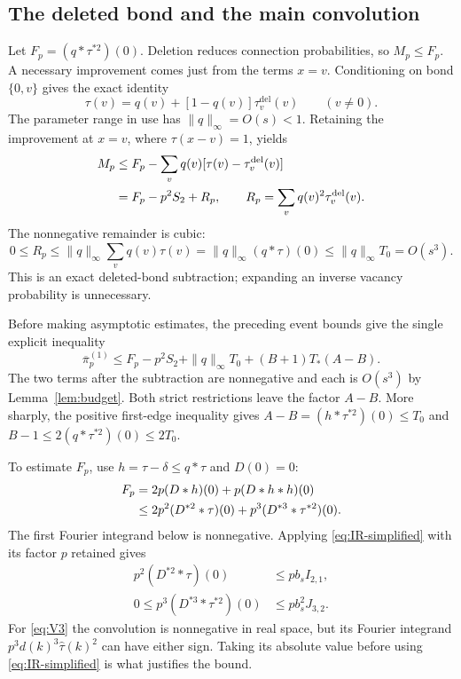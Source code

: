 \documentclass[11pt]{article}
\theoremstyle{definition}
\newcommand{\del}{\mathrm{del}}
\begin{document}
\subsection{The deleted bond and the main convolution}

Let $F_p=(q*\tau^{*2})(0)$. Deletion reduces connection probabilities,
so $M_p\le F_p$. A necessary improvement comes just from the terms
$x=v$. Conditioning on bond $\{0,v\}$ gives the exact identity
\begin{equation}\label{eq:bond-conditioning}
 \tau(v)=q(v)+[1-q(v)]\tau_v^{\del}(v)\qquad(v\ne0).
\end{equation}
The parameter range in use has $\|q\|_\infty=O(s)<1$. Retaining the
improvement at $x=v$, where $\tau(x-v)=1$, yields
\begin{align}
 M_p&\le F_p-\sum_vq(v)[\tau(v)-\tau_v^{\del}(v)]\notag\\
 &=F_p-p^2S_2+R_p,\qquad
 R_p=\sum_vq(v)^2\tau_v^{\del}(v).\label{eq:deleted-subtraction}
\end{align}
The nonnegative remainder is cubic:
\begin{equation}\label{eq:deleted-error}
 0\le R_p\le\|q\|_\infty\sum_vq(v)\tau(v)
 =\|q\|_\infty(q*\tau)(0)
 \le\|q\|_\infty T_0=O(s^3).
\end{equation}
This is an exact deleted-bond subtraction; expanding an inverse vacancy
probability is unnecessary.

Before making asymptotic estimates, the preceding event bounds give the
single explicit inequality
\begin{equation}\label{eq:exact-positive-bound}
 \boxed{\quad
 \overline\pi_p^{(1)}\le F_p-p^2S_2
  +\|q\|_\infty T_0+(B+1)T_*(A-B).
 \quad}
\end{equation}
The two terms after the subtraction are nonnegative and each is
$O(s^3)$ by Lemma~\ref{lem:budget}. Both strict restrictions leave
the factor $A-B$. More sharply, the positive first-edge inequality gives
$A-B=(h*\tau^{*2})(0)\le T_0$ and
$B-1\le2(q*\tau^{*2})(0)\le2T_0$.

To estimate $F_p$, use $h=\tau-\delta\le q*\tau$ and $D(0)=0$:
\begin{align}
 F_p&=2p(D*h)(0)+p(D*h*h)(0)\notag\\
 &\le2p^2(D^{*2}*\tau)(0)
      +p^3(D^{*3}*\tau^{*2})(0).\label{eq:F-decomposition}
\end{align}
The first Fourier integrand below is nonnegative. Applying
\eqref{eq:IR-simplified} with its factor $p$ retained gives
\begin{align}
 p^2(D^{*2}*\tau)(0)
 &\le p b_s I_{2,1},\label{eq:V2}\\
 0\le p^3(D^{*3}*\tau^{*2})(0)
 &\le p b_s^2 J_{3,2}.\label{eq:V3}
\end{align}
For \eqref{eq:V3} the convolution is nonnegative in real space, but
its Fourier integrand $p^3d(k)^3\widehat\tau(k)^2$ can have either sign.
Taking its absolute value before using \eqref{eq:IR-simplified} is what
justifies the bound.
\end{document}
